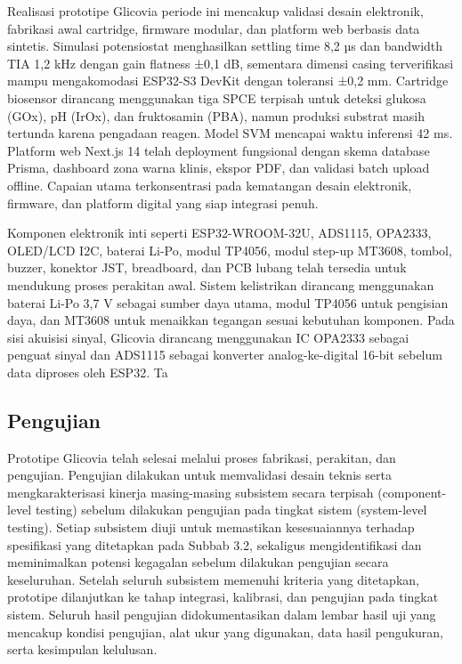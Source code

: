 \documentclass[a4paper,12pt]{article}
\begin{document}
Realisasi prototipe Glicovia periode ini mencakup validasi desain elektronik, fabrikasi awal cartridge, firmware modular, dan platform web berbasis data sintetis. Simulasi potensiostat menghasilkan settling time 8,2 µs dan bandwidth TIA 1,2 kHz dengan gain flatness ±0,1 dB, sementara dimensi casing terverifikasi mampu mengakomodasi ESP32-S3 DevKit dengan toleransi ±0,2 mm. Cartridge biosensor dirancang menggunakan tiga SPCE terpisah untuk deteksi glukosa (GOx), pH (IrOx), dan fruktosamin (PBA), namun produksi substrat masih tertunda karena pengadaan reagen. Model SVM mencapai waktu inferensi 42 ms. Platform web Next.js 14 telah deployment fungsional dengan skema database Prisma, dashboard zona warna klinis, ekspor PDF, dan validasi batch upload offline. Capaian utama terkonsentrasi pada kematangan desain elektronik, firmware, dan platform digital yang siap integrasi penuh.

Komponen elektronik inti seperti ESP32-WROOM-32U, ADS1115, OPA2333, OLED/LCD I2C, baterai Li-Po, modul TP4056, modul step-up MT3608, tombol, buzzer, konektor JST, breadboard, dan PCB lubang telah tersedia untuk mendukung proses perakitan awal. Sistem kelistrikan dirancang menggunakan baterai Li-Po 3,7 V sebagai sumber daya utama, modul TP4056 untuk pengisian daya, dan MT3608 untuk menaikkan tegangan sesuai kebutuhan komponen. Pada sisi akuisisi sinyal, Glicovia dirancang menggunakan IC OPA2333 sebagai penguat sinyal dan ADS1115 sebagai konverter analog-ke-digital 16-bit sebelum data diproses oleh ESP32. Ta

\subsection{Pengujian}

Prototipe Glicovia telah selesai melalui proses fabrikasi, perakitan, dan pengujian. Pengujian dilakukan untuk memvalidasi desain teknis serta mengkarakterisasi kinerja masing-masing subsistem secara terpisah (component-level testing) sebelum dilakukan pengujian pada tingkat sistem (system-level testing). Setiap subsistem diuji untuk memastikan kesesuaiannya terhadap spesifikasi yang ditetapkan pada Subbab 3.2, sekaligus mengidentifikasi dan meminimalkan potensi kegagalan sebelum dilakukan pengujian secara keseluruhan. Setelah seluruh subsistem memenuhi kriteria yang ditetapkan, prototipe dilanjutkan ke tahap integrasi, kalibrasi, dan pengujian pada tingkat sistem. Seluruh hasil pengujian didokumentasikan dalam lembar hasil uji yang mencakup kondisi pengujian, alat ukur yang digunakan, data hasil pengukuran, serta kesimpulan kelulusan.
\end{document}
